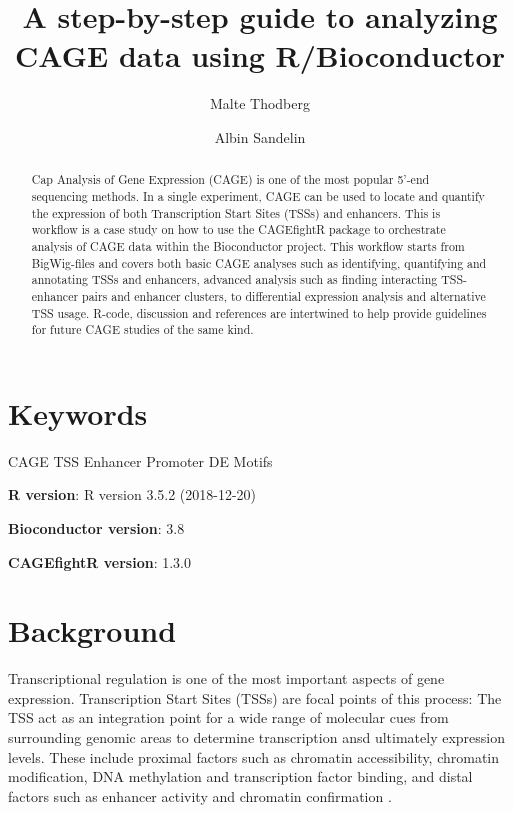 \documentclass[9pt,a4paper,]{extarticle}
\begin{document}
\pagestyle{front}

\title{A step-by-step guide to analyzing CAGE data using R/Bioconductor}

\author[1]{Malte Thodberg}
\author[1]{Albin Sandelin}

\maketitle
\thispagestyle{front}

\begin{abstract}
Cap Analysis of Gene Expression (CAGE) is one of the most popular 5'-end sequencing methods. In a single experiment, CAGE can be used to locate and quantify the expression of both Transcription Start Sites (TSSs) and enhancers. This is workflow is a case study on how to use the CAGEfightR package to orchestrate analysis of CAGE data within the Bioconductor project. This workflow starts from BigWig-files and covers both basic CAGE analyses such as identifying, quantifying and annotating TSSs and enhancers, advanced analysis such as finding interacting TSS-enhancer pairs and enhancer clusters, to differential expression analysis and alternative TSS usage. R-code, discussion and references are intertwined to help provide guidelines for future CAGE studies of the same kind.
\end{abstract}

\section*{Keywords}
CAGE TSS Enhancer Promoter DE Motifs


\clearpage
\pagestyle{main}

\textbf{R version}: R version 3.5.2 (2018-12-20)

\textbf{Bioconductor version}: 3.8

\textbf{CAGEfightR version}: 1.3.0

\section{Background}\label{background}

Transcriptional regulation is one of the most important aspects of gene expression. Transcription Start Sites (TSSs) are focal points of this process: The TSS act as an integration point for a wide range of molecular cues from surrounding genomic areas to determine transcription ansd ultimately expression levels. These include proximal factors such as chromatin accessibility, chromatin modification, DNA methylation and transcription factor binding, and distal factors such as enhancer activity and chromatin confirmation \citep{Smale2003, Kadonaga2012, Lenhard2012, Haberle2018}.
\end{document}
